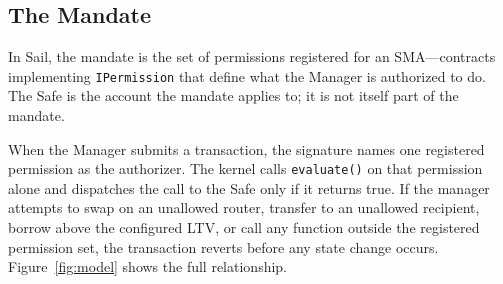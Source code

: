 \documentclass[11pt]{article}
\begin{document}
\subsection{The Mandate}

In Sail, the mandate is the set of permissions registered for an SMA---contracts implementing \texttt{IPermission} that define what the Manager is authorized to do. The Safe is the account the mandate applies to; it is not itself part of the mandate.

When the Manager submits a transaction, the signature names one registered permission as the authorizer. The kernel calls \texttt{evaluate()} on that permission alone and dispatches the call to the Safe only if it returns true. If the manager attempts to swap on an unallowed router, transfer to an unallowed recipient, borrow above the configured LTV, or call any function outside the registered permission set, the transaction reverts before any state change occurs. Figure~\ref{fig:model} shows the full relationship.
\end{document}
